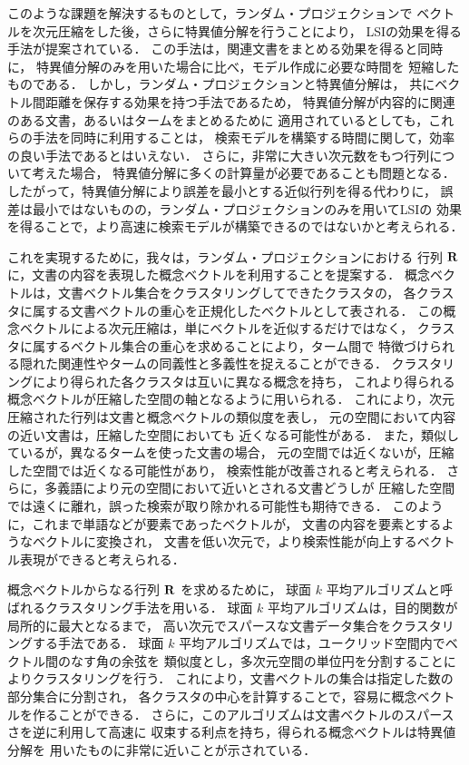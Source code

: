 このような課題を解決するものとして，ランダム・プロジェクションで
ベクトルを次元圧縮をした後，さらに特異値分解を行うことにより，
LSIの効果を得る手法が提案されている\cite{Papadimitriou}．
この手法は，関連文書をまとめる効果を得ると同時に，
特異値分解のみを用いた場合に比べ，モデル作成に必要な時間を
短縮したものである．
しかし，ランダム・プロジェクションと特異値分解は，
共にベクトル間距離を保存する効果を持つ手法であるため，
特異値分解が内容的に関連のある文書，あるいはタームをまとめるために
適用されているとしても，これらの手法を同時に利用することは，
検索モデルを構築する時間に関して，効率の良い手法であるとはいえない．
さらに，非常に大きい次元数をもつ行列について考えた場合，
特異値分解に多くの計算量が必要であることも問題となる．
したがって，特異値分解により誤差を最小とする近似行列を得る代わりに，
誤差は最小ではないものの，ランダム・プロジェクションのみを用いてLSIの
効果を得ることで，より高速に検索モデルが構築できるのではないかと考えられる．

これを実現するために，我々は，ランダム・プロジェクションにおける
行列 ${\bf R}$ に，文書の内容を表現した概念ベクトルを利用することを提案する．
概念ベクトルは，文書ベクトル集合をクラスタリングしてできたクラスタの，
各クラスタに属する文書ベクトルの重心を正規化したベクトルとして表される．
この概念ベクトルによる次元圧縮は，単にベクトルを近似するだけではなく，
クラスタに属するベクトル集合の重心を求めることにより，ターム間で
特徴づけられる隠れた関連性やタームの同義性と多義性を捉えることができる．
クラスタリングにより得られた各クラスタは互いに異なる概念を持ち，
これより得られる概念ベクトルが圧縮した空間の軸となるように用いられる．
これにより，次元圧縮された行列は文書と概念ベクトルの類似度を表し，
元の空間において内容の近い文書は，圧縮した空間においても
近くなる可能性がある．
また，類似しているが，異なるタームを使った文書の場合，
元の空間では近くないが，圧縮した空間では近くなる可能性があり，
検索性能が改善されると考えられる．
さらに，多義語により元の空間において近いとされる文書どうしが
圧縮した空間では遠くに離れ，誤った検索が取り除かれる可能性も期待できる．
このように，これまで単語などが要素であったベクトルが，
文書の内容を要素とするようなベクトルに変換され，
文書を低い次元で，より検索性能が向上するベクトル表現ができると考えられる．

概念ベクトルからなる行列 ${\bf R}$ を求めるために，
球面 $k$ 平均アルゴリズム\cite{Dhillon}と呼ばれるクラスタリング手法を用いる．
球面 $k$ 平均アルゴリズムは，目的関数が局所的に最大となるまで，
高い次元でスパースな文書データ集合をクラスタリングする手法である．
球面 $k$ 平均アルゴリズムでは，ユークリッド空間内でベクトル間のなす角の余弦を
類似度とし，多次元空間の単位円を分割することによりクラスタリングを行う．
これにより，文書ベクトルの集合は指定した数の部分集合に分割され，
各クラスタの中心を計算することで，容易に概念ベクトルを作ることができる．
さらに，このアルゴリズムは文書ベクトルのスパースさを逆に利用して高速に
収束する利点を持ち，得られる概念ベクトルは特異値分解を
用いたものに非常に近いことが示されている\cite{Dhillon}．

